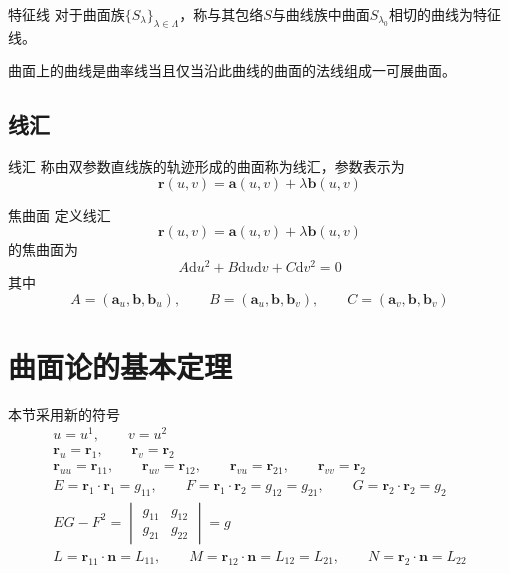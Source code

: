 \documentclass[lang = cn, scheme = chinese, thmcnt = section]{elegantbook}
\newcommand{\bs}{\boldsymbol}          %
\newcommand{\dd}{\mathrm{d}}           %
\begin{document}
\begin{definition}{特征线}
	对于曲面族$\{S_\lambda\}_{\lambda\in\Lambda}$，称与其包络$S$与曲线族中曲面$S_{\lambda_0}$相切的曲线为特征线。
\end{definition}

\begin{theorem}
	曲面上的曲线是曲率线当且仅当沿此曲线的曲面的法线组成一可展曲面。
\end{theorem}

\subsection{线汇}

\begin{definition}{线汇}
	称由双参数直线族的轨迹形成的曲面称为线汇，参数表示为%
	$$
	\bs{r}(u,v)=\bs{a}(u,v)+\lambda\bs{b}(u,v)
	$$
\end{definition}

\begin{definition}{焦曲面}
	定义线汇
	$$
	\bs{r}(u,v)=\bs{a}(u,v)+\lambda\bs{b}(u,v)
	$$
	的焦曲面为
	$$
	A\dd u^2+B\dd u\dd v+C\dd v^2=0
	$$
	其中%
	$$
	A=(\bs{a}_u,\bs{b},\bs{b}_u),\qquad 
	B=(\bs{a}_u,\bs{b},\bs{b}_v),\qquad
	C=(\bs{a}_v,\bs{b},\bs{b}_v)
	$$
\end{definition}

\section{曲面论的基本定理}

本节采用新的符号
\begin{gather*}
	u=u^1,\qquad v=u^2\\
	\bs{r}_u=\bs{r}_1,\qquad \bs{r}_v=\bs{r}_2\\
	\bs{r}_{uu}=\bs{r}_{11},\qquad 
	\bs{r}_{uv}=\bs{r}_{12},\qquad 
	\bs{r}_{vu}=\bs{r}_{21},\qquad 
	\bs{r}_{vv}=\bs{r}_{2}\\
	E=\bs{r}_1\cdot\bs{r}_1=g_{11},\qquad 
	F=\bs{r}_1\cdot\bs{r}_2=g_{12}=g_{21},\qquad 
	G=\bs{r}_2\cdot\bs{r}_2=g_{2}\\
	EG-F^2=\begin{vmatrix}
		g_{11} & g_{12}\\
		g_{21} & g_{22}
	\end{vmatrix}=g\\
	L=\bs{r}_{11}\cdot \bs{n}=L_{11},\qquad 
	M=\bs{r}_{12}\cdot \bs{n}=L_{12}=L_{21},\qquad 
	N=\bs{r}_{2}\cdot \bs{n}=L_{22}
\end{gather*}
\end{document}
